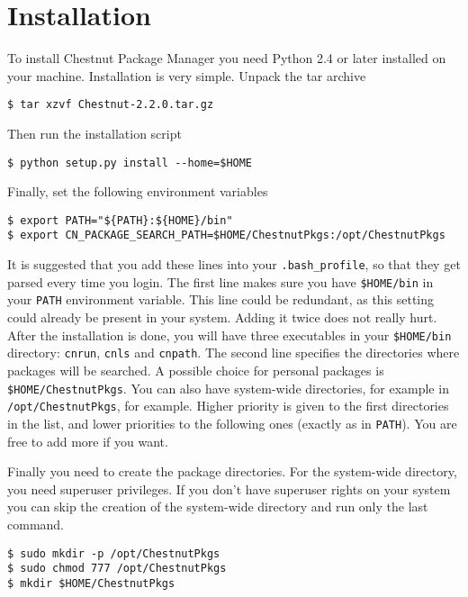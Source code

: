 \section{Installation}
To install Chestnut Package Manager you need Python 2.4 or later installed on
your machine. Installation is very simple. Unpack the tar archive

\begin{verbatim}
$ tar xzvf Chestnut-2.2.0.tar.gz
\end{verbatim}

Then run the installation script

\begin{verbatim}
$ python setup.py install --home=$HOME
\end{verbatim}

Finally, set the following environment variables

\begin{verbatim}
$ export PATH="${PATH}:${HOME}/bin"
$ export CN_PACKAGE_SEARCH_PATH=$HOME/ChestnutPkgs:/opt/ChestnutPkgs
\end{verbatim}

It is suggested that you add these lines into your \verb+.bash_profile+, so that they
get parsed every time you login.  The first line makes sure you have
\verb+$HOME/bin+ in your \verb+PATH+ environment variable. This line could be
redundant, as this setting could already be present in your system. Adding it
twice does not really hurt.  After the installation is done, you will have
three executables in your \verb+$HOME/bin+ directory: \verb+cnrun+, \verb+cnls+
and \verb+cnpath+.  The second line specifies the directories where packages
will be searched. A possible choice for personal packages is
\verb+$HOME/ChestnutPkgs+. You can also have system-wide directories, for
example in \verb+/opt/ChestnutPkgs+, for example. Higher priority is given to
the first directories in the list, and lower priorities to the following ones
(exactly as in \verb+PATH+). You are free to add more if you want.

Finally you need to create the package directories. For the system-wide
directory, you need superuser privileges.  If you don't have superuser rights
on your system you can skip the creation of the system-wide directory and run
only the last command.

\begin{verbatim}
$ sudo mkdir -p /opt/ChestnutPkgs
$ sudo chmod 777 /opt/ChestnutPkgs
$ mkdir $HOME/ChestnutPkgs
\end{verbatim}

